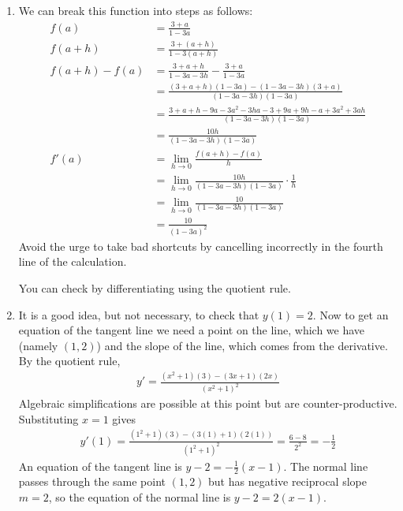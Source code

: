 \documentclass{article}
\newcommand{\ds}{\displaystyle}
\begin{document}
\begin{enumerate}
\item We can break this function into steps as follows:
  \begin{align*}
    f(a) &= \frac{3+a}{1-3a} \\
    f(a+h) &= \frac{3+(a+h)}{1-3(a+h)} \\
    f(a+h)-f(a) &= \frac{3+a+h}{1-3a-3h} - \frac{3+a}{1-3a}
    \\
    &= \frac{(3+a+h)(1-3a)-(1-3a-3h)(3+a)}{(1-3a-3h)(1-3a)}
    \\
    &= \frac{3+a+h-9a-3a^2-3ha - 3+9a+9h-a+3a^2+3ah}{(1-3a-3h)(1-3a)}
    \\
    &= \frac{10h}{(1-3a-3h)(1-3a)}
    \\
    f'(a) &= \lim_{h\to 0} \frac{f(a+h)-f(a)}{h}
    \\
    &= \lim_{h\to 0} \frac{10h}{(1-3a-3h)(1-3a)} \cdot \frac{1}{h}
    \\
    &= \lim_{h\to 0} \frac{10}{(1-3a-3h)(1-3a)}
    \\
    &= \frac{10}{(1-3a)^2}
  \end{align*}
  Avoid the urge to take bad shortcuts by cancelling incorrectly in the 
  fourth line of the calculation.

  You can check by differentiating using the quotient rule.
\item It is a good idea, but not necessary, to check that $y(1)=2$.  Now
  to get an equation of the tangent line we need a point on the line, which
  we have (namely $(1,2)$) and the slope of the line, which comes from
  the derivative.  By the quotient rule,
  \begin{align*}
    y' = \frac{(x^2+1)(3) - (3x+1)(2x)}{(x^2+1)^2}
  \end{align*}
  Algebraic simplifications are possible at this point
  but are counter-productive.  Substituting $x=1$ gives
  \begin{align*}
    y'(1) = \frac{(1^2+1)(3) - (3(1)+1)(2(1))}{(1^2+1)^2}
    = \frac{6-8}{2^2} = -\frac{1}{2}
  \end{align*}
  An equation of the tangent line is $\ds y-2=-\frac{1}{2} (x-1)$.
  The normal line passes through the same point $(1,2)$ but has negative
  reciprocal slope $m=2$, so the equation of the normal line is
  $y-2=2(x-1)$.


\end{enumerate}
\end{document}

